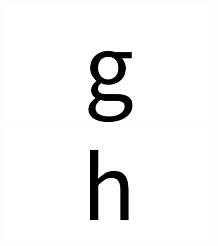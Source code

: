 \documentclass{article}
\begin{document}
\begin{figure}[H]
  \includegraphics[width=\linewidth]{g}
\endminipage\hfill
{}
  \includegraphics[width=\linewidth]{h}
\endminipage\hfill
\end{figure}
\end{document}
